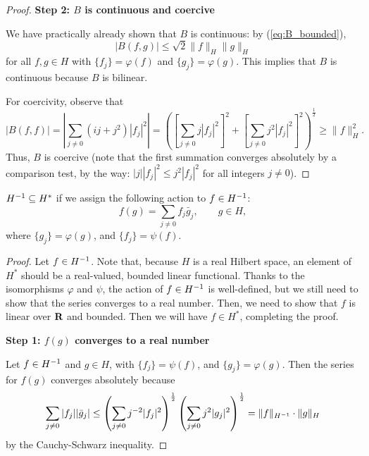 \documentclass{homework}
\begin{document}
\begin{arabicparts}
\begin{proof}
			\textbf{Step 2: $B$ is continuous and coercive}
			
			We have practically already shown that $B$ is continuous: by (\ref{eq:B_bounded}),
			\begin{equation}
				|B(f,g)| \le \sqrt{2}\lVert f\rVert_H\lVert g\rVert_H
			\end{equation}
			for all $f,g\in H$ with $\{f_j\} = \varphi(f)$ and $\{g_j\} = \varphi(g)$. This implies that $B$ is continuous because $B$ is bilinear.
			
			For coercivity, observe that
			\begin{equation}
				|B(f,f)| = \left|\sum_{j\ne0}(ij+j^2)|f_j|^2\right| = \left(\left[\sum_{j\ne0}j|f_j|^2\right]^2 + \left[\sum_{j\ne0}j^2|f_j|^2\right]^2\right)^\frac{1}{2} \ge \lVert f\rVert_H^2.
			\end{equation}
			Thus, $B$ is coercive (note that the first summation converges absolutely by a comparison test, by the way: $|j||f_j|^2 \le j^2|f_j|^2$ for all integers $j \ne 0$).
		\end{proof}
		
		\questionpart
		${H^{-1}} \subseteq H^*$ if we assign the following action to $f \in {H^{-1}}$:
		\begin{equation}
			f(g) = \sum_{j\ne0}f_j\bar{g}_j, \qquad g\in H,
		\end{equation}
		where $\{g_j\}=\varphi(g)$, and $\{f_j\} = \psi(f)$.
		
		\begin{proof}
			Let $f\in {H^{-1}}$. Note that, because $H$ is a real Hilbert space, an element of $H^*$ should be a real-valued, bounded linear functional. Thanks to the isomorphisms $\varphi$ and $\psi$, the action of $f \in {H^{-1}}$ is well-defined, but we still need to show that the series converges to a real number. Then, we need to show that $f$ is linear over $\textbf{R}$ and bounded. Then we will have $f \in H^*$, completing the proof.
			
			\textbf{Step 1: $f(g)$ converges to a real number}
			
			Let $f \in {H^{-1}}$ and $g\in H$, with $\{f_j\} = \psi(f)$, and $\{g_j\} = \varphi(g)$. Then the series for $f(g)$ converges absolutely because
			\begin{equation}
				\label{eq:f_bounded}
				\sum_{j\ne0}|f_j||\bar{g}_j| \le \left(\sum_{j\ne0}j^{-2}|f_j|^2\right)^\frac{1}{2}\left(\sum_{j\ne0}j^2|g_j|^2\right)^\frac{1}{2} = \lVert f\rVert_{H^{-1}}\cdot\lVert g\rVert_H
			\end{equation}
			by the Cauchy-Schwarz inequality.
			

\end{proof}
\end{arabicparts}
\end{document}
